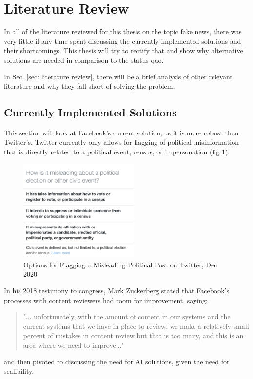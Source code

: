 \documentclass[preprint,review,12pt]{elsarticle}
\begin{document}
\section{Literature Review}
In all of the literature reviewed for this thesis on the topic fake news, there was very little if any time spent discussing the currently implemented solutions and their shortcomings. This thesis will try to rectify that and show why alternative solutions are needed in comparison to the status quo.

In Sec. \ref{sec: literature review}, there will be a brief analysis of other relevant literature and why they fall short of solving the problem.

\subsection{Currently Implemented Solutions}
\label{sec: currently implemented solutions}
This section will look at Facebook's current solution, as it is more robust than Twitter's. Twitter currently only allows for flagging of political misinformation that is directly related to a political event, census, or impersonation (fig \ref{img:TwitterPolitics}):
\begin{figure}[htp]
    \centering
    \includegraphics[width=6cm]{TwitterPolitics.jpg}
    \caption{Options for Flagging a Misleading Political Post on Twitter, Dec 2020}
    \label{img:TwitterPolitics}
\end{figure}

In his 2018 testimony to congress, Mark Zuckerberg stated that Facebook's processes with content reviewers had room for improvement, saying: \begin{quote}"... unfortunately, with the amount of content in our systems and the current systems that we have in place to review, we make a relatively small percent of mistakes in content review but that is too many, and this is an area where we need to improve..." \cite{energy2018facebook}\end{quote} and then pivoted to discussing the need for AI solutions, given the need for scalibility.
\end{document}
